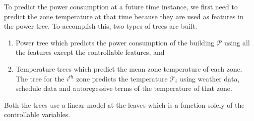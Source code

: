 To predict the power consumption at a future time instance, we first need to predict the zone temperature at that time because they are used as features in the power tree. To accomplish this, two types of trees are built.
\begin{enumerate}[leftmargin=0.5cm,topsep=1pt,itemsep=-1ex,partopsep=1ex,parsep=1ex]
\item Power tree which predicts the power consumption of the building $\mathcal{P}$ using all the features except the controllable features, and
\item Temperature trees which predict the mean zone temperature of each zone. The tree for the $i^{th}$ zone predicts the temperature $\mathcal{T}_i$ using weather data, schedule data and autoregessive terms of the temperature of that zone.
\end{enumerate}
Both the trees use a linear model at the leaves which is a function solely of the controllable variables.
